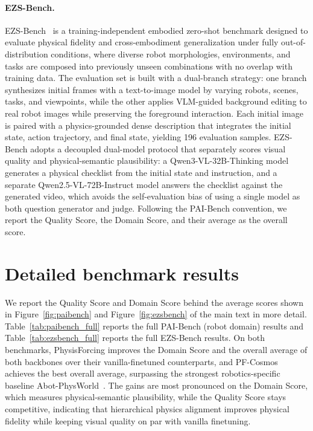 \paragraph{EZS-Bench.}
EZS-Bench~\cite{ali2025abot} is a training-independent embodied zero-shot benchmark
designed to evaluate physical fidelity and cross-embodiment generalization under fully
out-of-distribution conditions, where diverse robot morphologies, environments, and tasks
are composed into previously unseen combinations with no overlap with training data. The
evaluation set is built with a dual-branch strategy: one branch synthesizes initial frames
with a text-to-image model by varying robots, scenes, tasks, and viewpoints, while the
other applies VLM-guided background editing to real robot images while preserving the
foreground interaction. Each initial image is paired with a physics-grounded dense
description that integrates the initial state, action trajectory, and final state, yielding
196 evaluation samples. EZS-Bench adopts a decoupled dual-model protocol that separately
scores visual quality and physical-semantic plausibility: a Qwen3-VL-32B-Thinking model
generates a physical checklist from the initial state and instruction, and a separate
Qwen2.5-VL-72B-Instruct model answers the checklist against the generated video, which
avoids the self-evaluation bias of using a single model as both question generator and
judge. Following the PAI-Bench convention, we report the Quality Score, the Domain Score,
and their average as the overall score.

\section{Detailed benchmark results}
\label{appx:bench_results}

We report the Quality Score and Domain Score behind the average scores shown in
Figure~\ref{fig:paibench} and Figure~\ref{fig:ezsbench} of the main text in more detail.
Table~\ref{tab:paibench_full} reports the full PAI-Bench (robot domain) results and
Table~\ref{tab:ezsbench_full} reports the full EZS-Bench results. On both benchmarks, PhysisForcing improves the Domain Score and the
overall average of both backbones over their vanilla-finetuned counterparts, and
PF-Cosmos achieves the best overall average, surpassing the
strongest robotics-specific baseline Abot-PhysWorld~\cite{ali2025abot}. The gains are most
pronounced on the Domain Score, which measures physical-semantic plausibility, while the
Quality Score stays competitive, indicating that hierarchical physics alignment improves
physical fidelity while keeping visual quality on par with vanilla finetuning.

